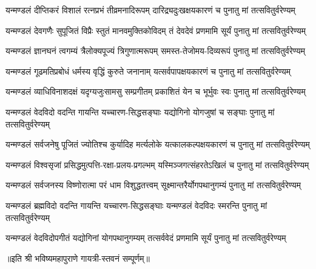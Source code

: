 
\twolineshloka
{यन्मण्डलं दीप्तिकरं विशालं रत्नप्रभं तीव्रमनादिरूपम्}
{दारिद्र्यदुःखक्षयकारणं च पुनातु मां तत्सवितुर्वरेण्यम्}

\twolineshloka
{यन्मण्डलं देवगणैः सुपूजितं   विप्रैः स्तुतं मानवमुक्तिकोविदम्}
{तं देवदेवं प्रणमामि सूर्यं   पुनातु मां तत्सवितुर्वरेण्यम्}

\twolineshloka
{यन्मण्डलं ज्ञानघनं त्वगम्यं   त्रैलोक्यपूज्यं त्रिगुणात्मरूपम्}
{समस्त-तेजोमय-दिव्यरूपं   पुनातु मां तत्सवितुर्वरेण्यम्}

\twolineshloka
{यन्मण्डलं गूढमतिप्रबोधं   धर्मस्य वृद्धिं कुरुते जनानाम्}
{यत्सर्वपापक्षयकारणं च   पुनातु मां तत्सवितुर्वरेण्यम्}

\twolineshloka
{यन्मण्डलं व्याधिविनाशदक्षं   यदृग्यजुःसामसु सम्प्रगीतम्}
{प्रकाशितं येन च भूर्भुवः स्वः   पुनातु मां तत्सवितुर्वरेण्यम्}

\twolineshloka
{यन्मण्डलं वेदविदो वदन्ति   गायन्ति यच्चारण-सिद्धसङ्घाः}
{यद्योगिनो योगजुषां च सङ्घाः   पुनातु मां तत्सवितुर्वरेण्यम्}

\twolineshloka
{यन्मण्डलं सर्वजनेषु पूजितं   ज्योतिश्च कुर्यादिह मर्त्यलोके}
{यत्कालकल्पक्षयकारणं च   पुनातु मां तत्सवितुर्वरेण्यम्}

\twolineshloka
{यन्मण्डलं विश्वसृजां प्रसिद्धमुत्पत्ति-रक्षा-प्रलय-प्रगल्भम्}
{यस्मिञ्जगत्संहरतेऽखिलं च   पुनातु मां तत्सवितुर्वरेण्यम्}

\twolineshloka
{यन्मण्डलं सर्वजनस्य विष्णोरात्मा   परं धाम विशुद्धतत्त्वम्}
{सूक्ष्मान्तरैर्योगपथानुगम्यं   पुनातु मां तत्सवितुर्वरेण्यम्}

\twolineshloka
{यन्मण्डलं ब्रह्मविदो वदन्ति   गायन्ति यच्चारण-सिद्धसङ्घाः}
{यन्मण्डलं वेदविदः स्मरन्ति   पुनातु मां तत्सवितुर्वरेण्यम्}

\twolineshloka
{यन्मण्डलं वेदविदोपगीतं   यद्योगिनां योगपथानुगम्यम्}
{तत्सर्ववेदं प्रणमामि सूर्यं   पुनातु मां तत्सवितुर्वरेण्यम्}

॥इति श्री भविष्यमहापुराणे गायत्री-स्तवनं सम्पूर्णम्॥